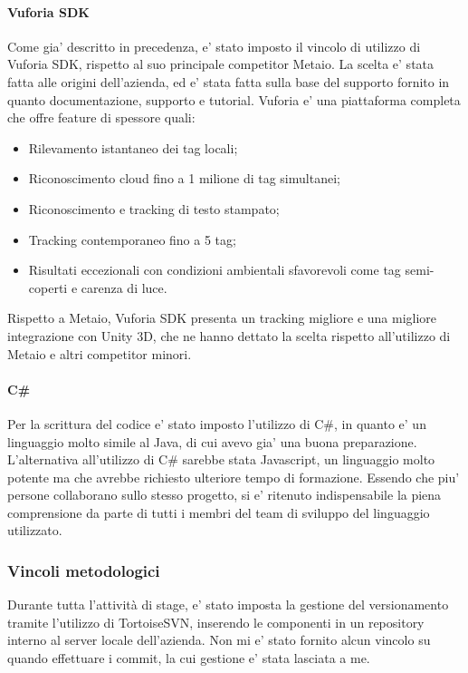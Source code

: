 \paragraph{Vuforia SDK}
Come gia' descritto in precedenza, e' stato imposto il vincolo di utilizzo di Vuforia SDK, rispetto al suo principale competitor Metaio. La scelta e' stata fatta alle origini dell'azienda, ed e' stata fatta sulla base del supporto fornito in quanto documentazione, supporto e tutorial. Vuforia e' una piattaforma completa che offre feature di spessore quali:

\begin{itemize}
	\item Rilevamento istantaneo dei tag locali;
	\item Riconoscimento cloud fino a 1 milione di tag simultanei;
	\item Riconoscimento e tracking di testo stampato;
	\item Tracking contemporaneo fino a 5 tag;
	\item Risultati eccezionali con condizioni ambientali sfavorevoli come tag semi-coperti e carenza di luce.
\end{itemize}

Rispetto a Metaio, Vuforia SDK presenta un tracking migliore e una migliore integrazione con Unity 3D, che ne hanno dettato la scelta rispetto all'utilizzo di Metaio e altri competitor minori. 


\paragraph{C\#}
Per la scrittura del codice e' stato imposto l'utilizzo di C\#, in quanto e' un linguaggio molto simile al Java, di cui avevo gia' una buona preparazione. L'alternativa all'utilizzo di C\# sarebbe stata Javascript, un linguaggio molto potente ma che avrebbe richiesto ulteriore tempo di formazione. Essendo che piu' persone collaborano sullo stesso progetto, si e' ritenuto indispensabile la piena comprensione da parte di tutti i membri del team di sviluppo del linguaggio utilizzato.

\subsubsection{Vincoli metodologici}
Durante tutta l’attività di stage, e' stato imposta la gestione del versionamento tramite l'utilizzo di TortoiseSVN, inserendo le componenti in un repository interno al server locale dell'azienda. Non mi e' stato fornito alcun vincolo su quando effettuare i commit, la cui gestione e' stata lasciata a me.


